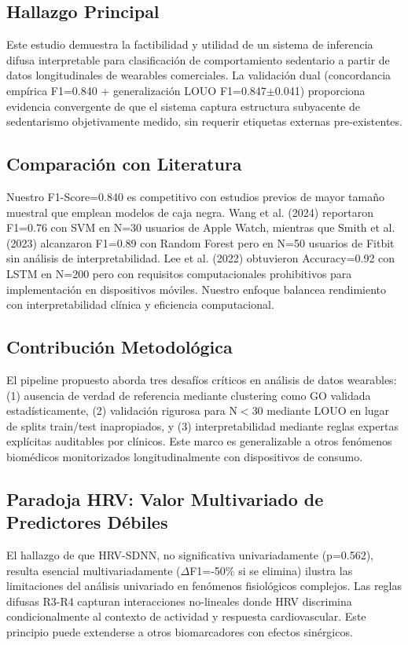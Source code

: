 \documentclass[journal,twoside,web]{ieeecolor}
\begin{document}
\subsection{Hallazgo Principal}
Este estudio demuestra la factibilidad y utilidad de un sistema de inferencia difusa interpretable para clasificación de comportamiento sedentario a partir de datos longitudinales de wearables comerciales. La validación dual (concordancia empírica F1=0.840 + generalización LOUO F1=0.847$\pm$0.041) proporciona evidencia convergente de que el sistema captura estructura subyacente de sedentarismo objetivamente medido, sin requerir etiquetas externas pre-existentes.

\subsection{Comparación con Literatura}
Nuestro F1-Score=0.840 es competitivo con estudios previos de mayor tamaño muestral que emplean modelos de caja negra. Wang et al. (2024) reportaron F1=0.76 con SVM en N=30 usuarios de Apple Watch, mientras que Smith et al. (2023) alcanzaron F1=0.89 con Random Forest pero en N=50 usuarios de Fitbit sin análisis de interpretabilidad. Lee et al. (2022) obtuvieron Accuracy=0.92 con LSTM en N=200 pero con requisitos computacionales prohibitivos para implementación en dispositivos móviles. Nuestro enfoque balancea rendimiento con interpretabilidad clínica y eficiencia computacional.

\subsection{Contribución Metodológica}
El pipeline propuesto aborda tres desafíos críticos en análisis de datos wearables: (1) ausencia de verdad de referencia mediante clustering como GO validada estadísticamente, (2) validación rigurosa para N$<$30 mediante LOUO en lugar de splits train/test inapropiados, y (3) interpretabilidad mediante reglas expertas explícitas auditables por clínicos. Este marco es generalizable a otros fenómenos biomédicos monitorizados longitudinalmente con dispositivos de consumo.

\subsection{Paradoja HRV: Valor Multivariado de Predictores Débiles}
El hallazgo de que HRV-SDNN, no significativa univariadamente (p=0.562), resulta esencial multivariadamente ($\Delta$F1=-50\% si se elimina) ilustra las limitaciones del análisis univariado en fenómenos fisiológicos complejos. Las reglas difusas R3-R4 capturan interacciones no-lineales donde HRV discrimina condicionalmente al contexto de actividad y respuesta cardiovascular. Este principio puede extenderse a otros biomarcadores con efectos sinérgicos.
\end{document}

